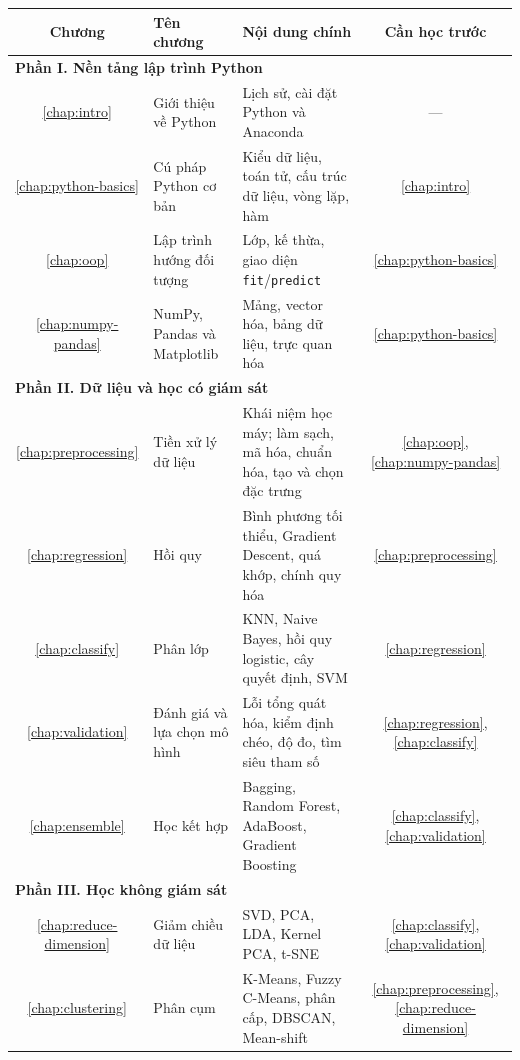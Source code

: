 \begin{table}[tbp]
\centering
\small
\begin{tabular}{|c|>{\raggedright\arraybackslash}p{4.3cm}|>{\raggedright\arraybackslash}p{6.2cm}|c|}
\hline
\textbf{Chương} & \textbf{Tên chương} & \textbf{Nội dung chính} & \textbf{Cần học trước} \\
\hline
\multicolumn{4}{|l|}{\textbf{Phần I. Nền tảng lập trình Python}} \\ \hline
\ref{chap:intro} & Giới thiệu về Python & Lịch sử, cài đặt Python và Anaconda & --- \\ \hline
\ref{chap:python-basics} & Cú pháp Python cơ bản & Kiểu dữ liệu, toán tử, cấu trúc dữ liệu, vòng lặp, hàm & \ref{chap:intro} \\ \hline
\ref{chap:oop} & Lập trình hướng đối tượng & Lớp, kế thừa, giao diện \texttt{fit}/\texttt{predict} & \ref{chap:python-basics} \\ \hline
\ref{chap:numpy-pandas} & NumPy, Pandas và Matplotlib & Mảng, vector hóa, bảng dữ liệu, trực quan hóa & \ref{chap:python-basics} \\ \hline
\multicolumn{4}{|l|}{\textbf{Phần II. Dữ liệu và học có giám sát}} \\ \hline
\ref{chap:preprocessing} & Tiền xử lý dữ liệu & Khái niệm học máy; làm sạch, mã hóa, chuẩn hóa, tạo và chọn đặc trưng & \ref{chap:oop}, \ref{chap:numpy-pandas} \\ \hline
\ref{chap:regression} & Hồi quy & Bình phương tối thiểu, Gradient Descent, quá khớp, chính quy hóa & \ref{chap:preprocessing} \\ \hline
\ref{chap:classify} & Phân lớp & KNN, Naive Bayes, hồi quy logistic, cây quyết định, SVM & \ref{chap:regression} \\ \hline
\ref{chap:validation} & Đánh giá và lựa chọn mô hình & Lỗi tổng quát hóa, kiểm định chéo, độ đo, tìm siêu tham số & \ref{chap:regression}, \ref{chap:classify} \\ \hline
\ref{chap:ensemble} & Học kết hợp & Bagging, Random Forest, AdaBoost, Gradient Boosting & \ref{chap:classify}, \ref{chap:validation} \\ \hline
\multicolumn{4}{|l|}{\textbf{Phần III. Học không giám sát}} \\ \hline
\ref{chap:reduce-dimension} & Giảm chiều dữ liệu & SVD, PCA, LDA, Kernel PCA, t-SNE & \ref{chap:classify}, \ref{chap:validation} \\ \hline
\ref{chap:clustering} & Phân cụm & K-Means, Fuzzy C-Means, phân cấp, DBSCAN, Mean-shift & \ref{chap:preprocessing}, \ref{chap:reduce-dimension} \\ \hline

\end{tabular}
\end{table}
